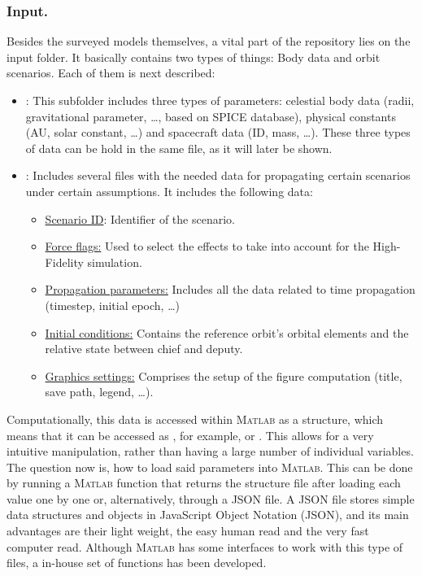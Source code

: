 		\subsubsection{Input.}
		\indent Besides the surveyed models themselves, a vital part of the repository lies on the input folder. It basically contains two types of things: Body data and orbit scenarios. Each of them is next described:
		\begin{itemize}
		\item[\GMVred{1.}]: This subfolder includes three types of parameters: celestial body data (\eg radii, gravitational parameter, \ldots, based on SPICE database), physical constants (\eg AU, solar constant, \ldots) and spacecraft data (\eg ID, mass, \ldots). These three types of data can be hold in the same file, as it will later be shown.
		\item[\GMVred{2.}]: Includes several files with the needed data for propagating certain scenarios under certain assumptions. It includes the following data:
			\begin{itemize}
			\item \underline{Scenario ID}: Identifier of the scenario.
			\item \underline{Force flags:} Used to select the effects to take into account for the High-Fidelity simulation.
			\item \underline{Propagation parameters:} Includes all the data related to time propagation (\eg timestep, initial epoch, \ldots)
			\item \underline{Initial conditions:} Contains the reference orbit's orbital elements and the relative state between chief and deputy.
			\item \underline{Graphics settings:} Comprises the setup of the figure computation (\eg title, save path, legend, \ldots).
			\end{itemize}
		\end{itemize}
		\indent Computationally, this data is accessed within \textsc{Matlab} as a structure, which means that it can be accessed as , for example, or . This allows for a very intuitive manipulation, rather than having a large number of individual variables. \\
		\indent The question now is, how to load said parameters into \textsc{Matlab}. This can be done by running a \textsc{Matlab} function that returns the structure file after loading each value one by one or, alternatively, through a JSON file. A JSON file stores simple data structures and objects in JavaScript Object Notation (JSON), and its main advantages are their light weight, the easy human read and the very fast computer read. Although \textsc{Matlab} has some interfaces to work with this type of files, a in-house set of functions has been developed.
